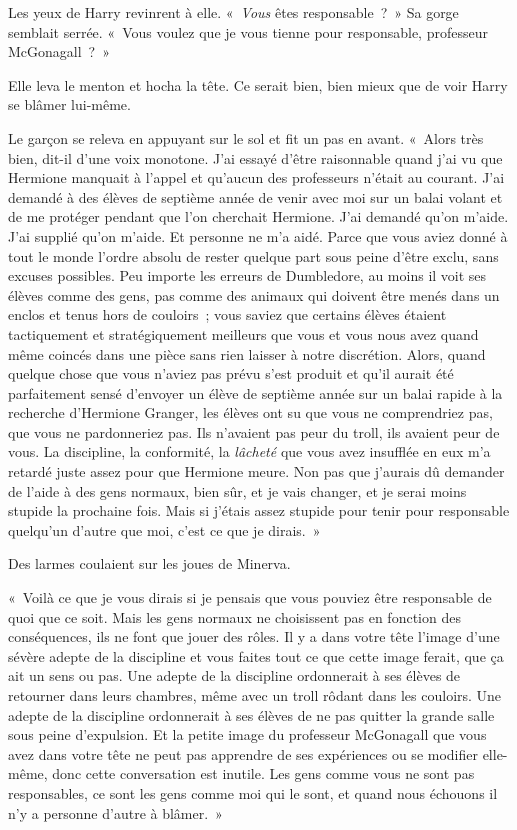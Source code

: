 Les yeux de Harry revinrent à elle. «~\emph{Vous} êtes responsable~?~» Sa gorge semblait serrée. «~Vous voulez que je vous tienne pour responsable, professeur McGonagall~?~»

Elle leva le menton et hocha la tête. Ce serait bien, bien mieux que de voir Harry se blâmer lui-même.

Le garçon se releva en appuyant sur le sol et fit un pas en avant. «~Alors très bien, dit-il d'une voix monotone. J'ai essayé d'être raisonnable quand j'ai vu que Hermione manquait à l'appel et qu'aucun des professeurs n'était au courant. J'ai demandé à des élèves de septième année de venir avec moi sur un balai volant et de me protéger pendant que l'on cherchait Hermione. J'ai demandé qu'on m'aide. J'ai supplié qu'on m'aide. Et personne ne m'a aidé. Parce que vous aviez donné à tout le monde l'ordre absolu de rester quelque part sous peine d'être exclu, sans excuses possibles. Peu importe les erreurs de Dumbledore, au moins il voit ses élèves comme des gens, pas comme des animaux qui doivent être menés dans un enclos et tenus hors de couloirs~; vous saviez que certains élèves étaient tactiquement et stratégiquement meilleurs que vous et vous nous avez quand même coincés dans une pièce sans rien laisser à notre discrétion. Alors, quand quelque chose que vous n'aviez pas prévu s'est produit et qu'il aurait été parfaitement sensé d'envoyer un élève de septième année sur un balai rapide à la recherche d'Hermione Granger, les élèves ont su que vous ne comprendriez pas, que vous ne pardonneriez pas. Ils n'avaient pas peur du troll, ils avaient peur de vous. La discipline, la conformité, la \emph{lâcheté} que vous avez insufflée en eux m'a retardé juste assez pour que Hermione meure. Non pas que j'aurais dû demander de l'aide à des gens normaux, bien sûr, et je vais changer, et je serai moins stupide la prochaine fois. Mais si j'étais assez stupide pour tenir pour responsable quelqu'un d'autre que moi, c'est ce que je dirais.~»

Des larmes coulaient sur les joues de Minerva.

«~Voilà ce que je vous dirais si je pensais que vous pouviez être responsable de quoi que ce soit. Mais les gens normaux ne choisissent pas en fonction des conséquences, ils ne font que jouer des rôles. Il y a dans votre tête l'image d'une sévère adepte de la discipline et vous faites tout ce que cette image ferait, que ça ait un sens ou pas. Une adepte de la discipline ordonnerait à ses élèves de retourner dans leurs chambres, même avec un troll rôdant dans les couloirs. Une adepte de la discipline ordonnerait à ses élèves de ne pas quitter la grande salle sous peine d'expulsion. Et la petite image du professeur McGonagall que vous avez dans votre tête ne peut pas apprendre de ses expériences ou se modifier elle-même, donc cette conversation est inutile. Les gens comme vous ne sont pas responsables, ce sont les gens comme moi qui le sont, et quand nous échouons il n'y a personne d'autre à blâmer.~»

